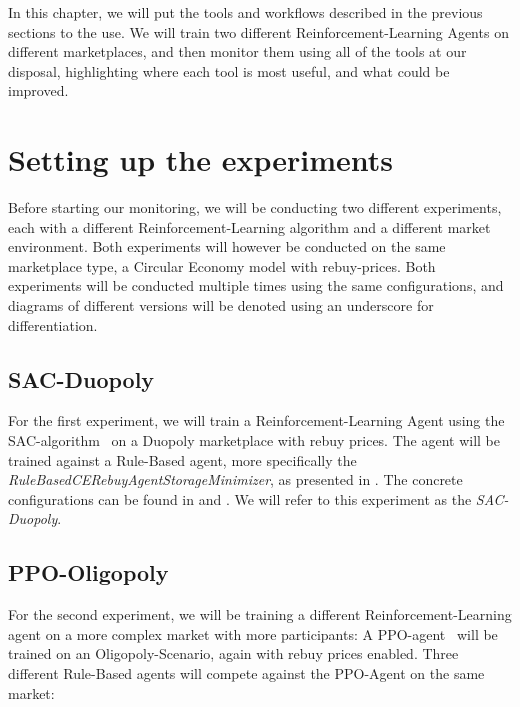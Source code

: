 \label{ch:AnalyzingGraphs}

\begin{jointwork}
	In this chapter, we will put the tools and workflows described in the previous sections to the use. We will train two different Reinforcement-Learning Agents on different marketplaces, and then monitor them using all of the tools at our disposal, highlighting where each tool is most useful, and what could be improved.
\end{jointwork}

\section*{Setting up the experiments}

Before starting our monitoring, we will be conducting two different experiments, each with a different Reinforcement-Learning algorithm and a different market environment. Both experiments will however be conducted on the same marketplace type, a Circular Economy model with rebuy-prices. Both experiments will be conducted multiple times using the same configurations, and diagrams of different versions will be denoted using an underscore for differentiation.

\subsection*{SAC-Duopoly}

For the first experiment, we will train a Reinforcement-Learning Agent using the SAC-algorithm~\cite{StableBaselines3SAC} on a Duopoly marketplace with rebuy prices. The agent will be trained against a Rule-Based agent, more specifically the \emph{RuleBasedCERebuyAgentStorageMinimizer}, as presented in . The concrete configurations can be found in  and . We will refer to this experiment as the \emph{SAC-Duopoly}.

\subsection*{PPO-Oligopoly}

For the second experiment, we will be training a different Reinforcement-Learning agent on a more complex market with more participants: A PPO-agent~\cite{StableBaselines3PPO} will be trained on an Oligopoly-Scenario, again with rebuy prices enabled. Three different Rule-Based agents will compete against the PPO-Agent on the same market:


